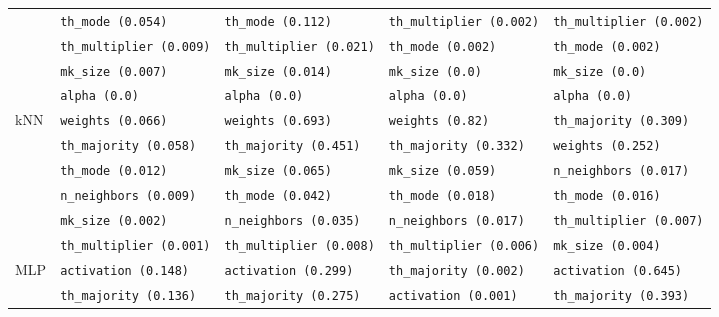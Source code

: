 \begin{table}[ht]
\begin{adjustwidth}{-3.5cm}{}
\begin{tabular}{lllll}
                  & \texttt{th\_mode (0.054)}             & \texttt{th\_mode (0.112)}             & \texttt{th\_multiplier (0.002)}     & \texttt{th\_multiplier (0.002)}       \\
                  & \texttt{th\_multiplier (0.009)}       & \texttt{th\_multiplier (0.021)}       & \texttt{th\_mode (0.002)}           & \texttt{th\_mode (0.002)}             \\
                  & \texttt{mk\_size (0.007)}             & \texttt{mk\_size (0.014)}             & \texttt{mk\_size (0.0)}             & \texttt{mk\_size (0.0)}               \\
                  & \texttt{alpha (0.0)}                  & \texttt{alpha (0.0)}                  & \texttt{alpha (0.0)}                & \texttt{alpha (0.0)}                  \\
        kNN       & \texttt{weights (0.066)}              & \texttt{weights (0.693)}              & \texttt{weights (0.82)}             & \texttt{th\_majority (0.309)}         \\
                  & \texttt{th\_majority (0.058)}         & \texttt{th\_majority (0.451)}         & \texttt{th\_majority (0.332)}       & \texttt{weights (0.252)}              \\
                  & \texttt{th\_mode (0.012)}             & \texttt{mk\_size (0.065)}             & \texttt{mk\_size (0.059)}           & \texttt{n\_neighbors (0.017)}         \\
                  & \texttt{n\_neighbors (0.009)}         & \texttt{th\_mode (0.042)}             & \texttt{th\_mode (0.018)}           & \texttt{th\_mode (0.016)}             \\
                  & \texttt{mk\_size (0.002)}             & \texttt{n\_neighbors (0.035)}         & \texttt{n\_neighbors (0.017)}       & \texttt{th\_multiplier (0.007)}       \\
                  & \texttt{th\_multiplier (0.001)}       & \texttt{th\_multiplier (0.008)}       & \texttt{th\_multiplier (0.006)}     & \texttt{mk\_size (0.004)}             \\
        MLP       & \texttt{activation (0.148)}           & \texttt{activation (0.299)}           & \texttt{th\_majority (0.002)}       & \texttt{activation (0.645)}           \\
                  & \texttt{th\_majority (0.136)}         & \texttt{th\_majority (0.275)}         & \texttt{activation (0.001)}         & \texttt{th\_majority (0.393)}         \\

\end{tabular}
\end{adjustwidth}
\end{table}
